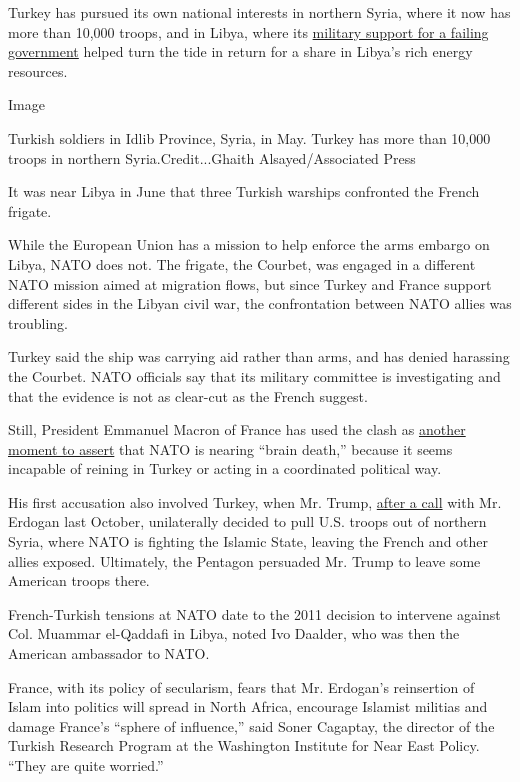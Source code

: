 Turkey has pursued its own national interests in northern Syria, where
it now has more than 10,000 troops, and in Libya, where its
\href{https://www.nytimes.com/2020/01/02/world/europe/erdogan-turkey-libya.html}{military
support for a failing government} helped turn the tide in return for a
share in Libya's rich energy resources.

Image

Turkish soldiers in Idlib Province, Syria, in May. Turkey has more than
10,000 troops in northern Syria.Credit...Ghaith Alsayed/Associated Press

It was near Libya in June that three Turkish warships confronted the
French frigate.

While the European Union has a mission to help enforce the arms embargo
on Libya, NATO does not. The frigate, the Courbet, was engaged in a
different NATO mission aimed at migration flows, but since Turkey and
France support different sides in the Libyan civil war, the
confrontation between NATO allies was troubling.

Turkey said the ship was carrying aid rather than arms, and has denied
harassing the Courbet. NATO officials say that its military committee is
investigating and that the evidence is not as clear-cut as the French
suggest.

Still, President Emmanuel Macron of France has used the clash as
\href{https://www.euronews.com/2020/06/23/emmanuel-macron-turkey-is-playing-a-dangerous-game-in-libya}{another
moment to assert} that NATO is nearing ``brain death,'' because it seems
incapable of reining in Turkey or acting in a coordinated political way.

His first accusation also involved Turkey, when Mr. Trump,
\href{https://www.foxnews.com/politics/trump-phone-call-erdogan-turkey-syria}{after
a call} with Mr. Erdogan last October, unilaterally decided to pull U.S.
troops out of northern Syria, where NATO is fighting the Islamic State,
leaving the French and other allies exposed. Ultimately, the Pentagon
persuaded Mr. Trump to leave some American troops there.

French-Turkish tensions at NATO date to the 2011 decision to intervene
against Col. Muammar el-Qaddafi in Libya, noted Ivo Daalder, who was
then the American ambassador to NATO.

France, with its policy of secularism, fears that Mr. Erdogan's
reinsertion of Islam into politics will spread in North Africa,
encourage Islamist militias and damage France's ``sphere of influence,''
said Soner Cagaptay, the director of the Turkish Research Program at the
Washington Institute for Near East Policy. ``They are quite worried.''

